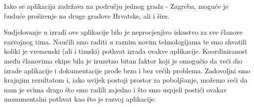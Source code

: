 		Iako se aplikacija zadržava na području jednog grada - Zagreba, moguće je buduće proširenje na druge gradove Hrvatske, ali i šire. 
		
		Sudjelovanje u izradi ove aplikacije bilo je neprocjenjivo iskustvo za sve članove razvojnog tima. Naučili smo raditi u raznim novim tehnologijama te smo shvatili koliki je vremenski (ali i timski) pothvat izrada ovakve aplikacije. Koordiniranost među članovima ekipe bila je izuzetno bitan faktor koji je omogućio da veći dio izrade aplikacije i dokumentacije prođe brzo i bez većih problema. Zadovoljni smo krajnjim rezultatom i, iako uvijek postoji prostor za poboljšanje, možemo reći da nam je svima drago što smo radili zajedno i što smo uspjeli postići ovakav monumentalni pothvat kao što je razvoj aplikacije.
		
		
		\eject 
